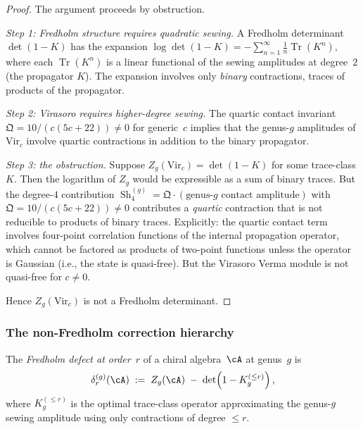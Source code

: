 \begin{proof}
The argument proceeds by obstruction.

\emph{Step 1: Fredholm structure requires quadratic sewing.}
A Fredholm determinant $\det(1 - K)$ has the expansion
$\log\det(1-K) = -\sum_{n=1}^\infty
\frac{1}{n}\operatorname{Tr}(K^n)$,
where each $\operatorname{Tr}(K^n)$ is a linear functional
of the sewing amplitudes at degree~$2$ (the propagator $K$).
The expansion involves only \emph{binary} contractions, traces
of products of the propagator.

\emph{Step 2: Virasoro requires higher-degree sewing.}
The quartic contact invariant
$\mathfrak{Q} = 10/(c(5c+22)) \ne 0$ for generic~$c$
implies that the genus-$g$ amplitudes of $\mathrm{Vir}_c$
involve quartic contractions in addition to the binary propagator.

\emph{Step 3: the obstruction.}
Suppose $Z_g(\mathrm{Vir}_c) = \det(1-K)$ for some
trace-class $K$. Then the logarithm of $Z_g$ would be
expressible as a sum of binary traces. But the degree-$4$
contribution
$\operatorname{Sh}_4^{(g)} = \mathfrak{Q} \cdot (\text{genus-$g$ contact amplitude})$
with $\mathfrak{Q} = 10/(c(5c+22)) \ne 0$ contributes a
\emph{quartic} contraction that is not reducible to products of
binary traces. Explicitly: the quartic contact term involves
four-point correlation functions of the internal propagation
operator, which cannot be factored as products of two-point
functions unless the operator is Gaussian (i.e., the state is
quasi-free). But the Virasoro Verma module is not quasi-free
for $c \ne 0$.

Hence $Z_g(\mathrm{Vir}_c)$ is not a Fredholm determinant.
\end{proof}

\subsubsection*{The non-Fredholm correction hierarchy}

\begin{definition}
\label{def:gravity-fredholm-defect}
The \emph{Fredholm defect at order~$r$} of a chiral algebra~$\cA$
at genus~$g$ is
\[
\delta_r^{(g)}(\cA)
\;:=\;
Z_g(\cA)
\;-\;
\det\!\left(1 - K_g^{(\le r)}\right),
\]
where $K_g^{(\le r)}$ is the optimal trace-class operator
approximating the genus-$g$ sewing amplitude using only
contractions of degree $\le r$.
\end{definition}

